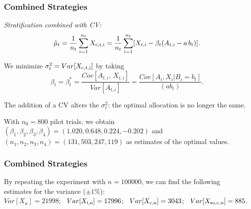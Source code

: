 \documentclass[t,usepdftitle=false]{beamer}
\begin{document}
\begin{frame}
	\frametitle{Combined Strategies}
	
	\emph{Stratification combined with CV:}\\
	$$ 
	{\hat\mu_t} = {1\over n_t} \sum_{i=1}^{n_t} X_{\rm{c},t,i} 
	= {1\over n_t} \sum_{i=1}^{n_t} 
	[X_{t,i} - \beta_t (A_{t,i} - a\,b_t)].
	$$
	
	\mbox{}
	
	We minimize \(\sigma_t^2 = Var[X_{\rm{c},t,i}]\) by taking 
	\[
	\beta_t = {\beta_t^*} = \frac{Cov[A_{t,i},\, X_{t,i}]}{Var[A_{t,i}]}
	= \frac{Cov[A_i, X_i | B_i=b_t]}{(a b_t)}.
	\]
	
	\mbox{}
	
	The addition of a CV alters the \(\sigma_t^2\): the optimal allocation 
	is no longer the same.
	
	\mbox{}
	
	With \(n_0=800\) pilot trials, we obtain
	\((\beta_1,\beta_2, \beta_3, \beta_4) = (1.020, 0.648, 0.224, -0.202)\) 
	and \((n_1, n_2, n_3, n_4) = (131, 503, 247, 119)\) 
	as estimates of the optimal values.
	
\end{frame}

\begin{frame}
	\frametitle{Combined Strategies}
	
	By repeating the experiment with \(n = 100000\), we can find the following estimates for the variance (\(\pm 1\%\)):\\
	$Var[X_{n}] = 21998$; \
	$Var[X_{\rm{i},n}] = 17996$; \
	$Var[X_{\rm{c},n}] = 3043$; \
	$Var[X_{\rm{s}o,\rm{c},n}] = 885$.
	
\end{frame}
\end{document}
